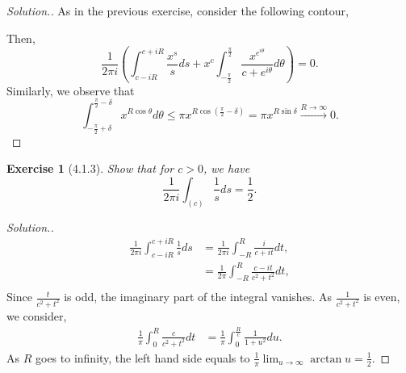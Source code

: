 \documentclass{article}
\newtheorem{exercise}{Exercise}[section]
\begin{document}
\begin{proof}[Solution.]
  As in the previous exercise, consider the following contour,
    \begin{center}
\end{center}
Then,
\begin{equation*}
  {\frac 1 {2\pi i}}\left(\int_{c-iR}^{c+iR}{\frac {x^s} s}ds+x^c\int_{-{\frac {\pi} 2}}^{{\frac {\pi} 2}} {\frac {x^{e^{i\theta}}} {c+e^{i\theta}}}d\theta\right) = 0.
\end{equation*}
Similarly, we observe that 
\begin{equation*}
  \int_{-{\frac {\pi} 2}+\delta}^{{\frac {\pi} 2}-\delta}x^{R\cos\theta}d\theta\leq \pi x^{R\cos\left({\frac \pi 2}-\delta\right)} = \pi x^{R\sin\delta}\stackrel{R\to\infty}{\to}0.
\end{equation*}
\end{proof}
\begin{exercise}[4.1.3]
  Show that for $c>0$, we have
  \begin{equation*}
    {\frac 1 {2\pi i}}\int_{(c)}{\frac {1} s}ds = {\frac 1 2}.
  \end{equation*}
\end{exercise}
\begin{proof}[Solution.]
  \begin{align*}
    {\frac 1 {2\pi i}}\int_{c-iR}^{c+iR} {\frac {1} s}ds & = {\frac 1 {2\pi i}}\int_{-R}^{R} {\frac {i} {c+it}}dt,\\
    & = {\frac 1 {2\pi }}\int_{-R}^{R} {\frac {c-it} {c^2+t^2}}dt,\\
  \end{align*}
  Since ${\frac {t} {c^2+t^2}}$ is odd, the imaginary part of the integral vanishes. As ${\frac {1} {c^2+t^2}}$ is even, we consider,
  \begin{align*}
    {\frac 1 {\pi }}\int_0^R{\frac {c} {c^2+t^2}}dt & = {\frac 1 {\pi }}\int_0^{{\frac R c}}{\frac {1} {1+u^2}}du.
  \end{align*}
  As $R$ goes to infinity, the left hand side equals to ${\frac 1 {\pi }}\lim_{u\to\infty}\arctan u={\frac 1 2}$.
\end{proof}
\end{document}
